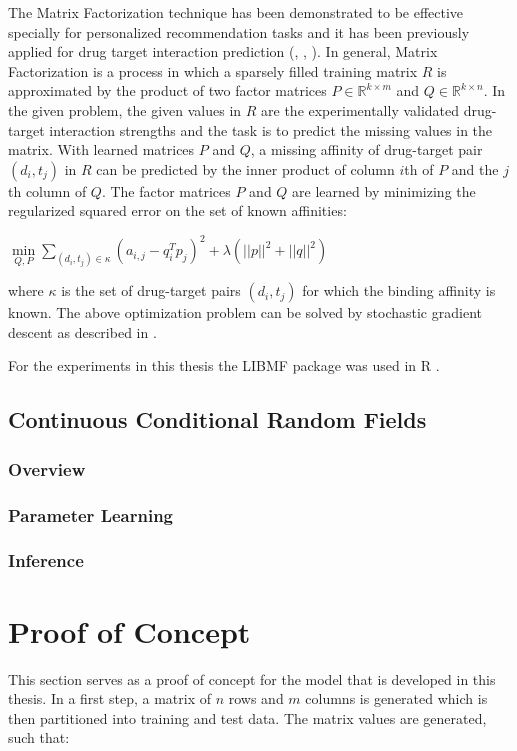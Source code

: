 \documentclass{sfuthesis}
\begin{document}
The Matrix Factorization technique has been demonstrated to be effective specially for personalized recommendation tasks \cite{Koren:2009:MFT:1608565.1608614} and it has been previously applied for drug target interaction prediction (\cite{liu2016neighborhood}, \cite{ezzat2016drug}, \cite{gonen2013kernelized}). In general, Matrix Factorization is a process in which a sparsely filled training matrix $R$ is approximated by the product of two factor matrices $P \in \mathbb{R}^{k\times m}$ and $Q \in \mathbb{R}^{k\times n}$. In the given problem, the given values in $R$ are the experimentally validated drug-target interaction strengths and the task is to predict the missing values in the matrix. With learned matrices $P$ and $Q$, a missing affinity of drug-target pair $(d_i, t_j)$ in $R$ can be predicted by the inner product of column $i$th of $P$ and the $j$th column of $Q$.
The factor matrices $P$ and $Q$ are learned by minimizing the regularized squared error on the set of known affinities:
\begin{center}
$\min\limits_{Q,P}{\sum\limits_{(d_i,t_j)\in \kappa} (a_{i,j}-q_i^Tp_j)^2} + \lambda (||p||^2 + ||q||^2)$
\end{center}
where $\kappa$ is the set of drug-target pairs $(d_i,t_j)$ for which the binding affinity is known. The above optimization problem can be solved by stochastic gradient descent as described in \cite{Koren:2009:MFT:1608565.1608614}.

For the experiments in this thesis the LIBMF package was used in R \cite{chin2016libmf}.

\subsection{Continuous Conditional Random Fields}
\subsubsection{Overview}
\subsubsection{Parameter Learning}
\subsubsection{Inference}

\section{Proof of Concept}
This section serves as a proof of concept for the model that is developed in this thesis. In a first step, a matrix of $n$ rows and $m$ columns is generated which is then partitioned into training and test data. The matrix values are generated, such that:
\end{document}

